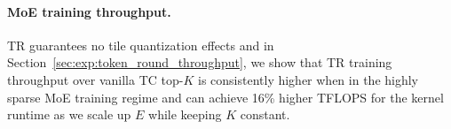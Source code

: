 

\paragraph{MoE training throughput.}

TR guarantees no tile quantization effects and in Section~\ref{sec:exp:token_round_throughput}, we show that TR training throughput over vanilla TC top-$K$ is consistently higher when in the highly sparse MoE training regime and can achieve 16\% higher TFLOPS for the kernel runtime as we scale up $E$ while keeping $K$ constant. 

